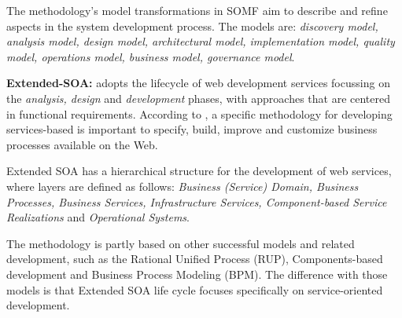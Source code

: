 The methodology's model transformations in SOMF aim to
describe and refine aspects in the system development
process. The models are: \textit{discovery model, analysis model, design model,
architectural model, implementation model, quality model, operations model,
business model, governance model}. 

% 


\bigskip

\textbf{Extended-SOA:} \cite{PapazoglouH06} adopts the lifecycle
of web development services focussing on the \textit{analysis, design}
and \textit{development} phases, with approaches that are centered in
functional requirements.  According to \cite{PapazoglouH06}, a specific
methodology for developing services-based is important to specify, build, improve and customize business processes available on the Web. 

Extended SOA has a hierarchical structure for the development of web
services, where layers are defined as follows: \textit{Business (Service)
Domain, Business Processes, Business Services, Infrastructure Services,
Component-based Service Realizations} and \textit{Operational Systems}.

The methodology is partly based on other successful models and
related development, such as the Rational Unified Process (RUP),
Components-based development and Business Process Modeling (BPM). The difference
with those models is that Extended SOA life cycle focuses specifically on
service-oriented development.

